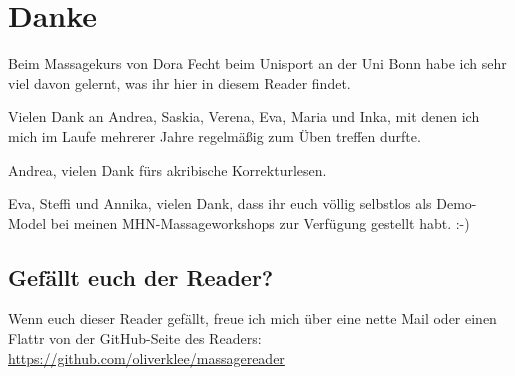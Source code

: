 \section*{Danke}

Beim Massagekurs von Dora Fecht beim Unisport an der Uni Bonn habe ich sehr viel davon gelernt, was ihr hier in diesem Reader findet.

Vielen Dank an Andrea, Saskia, Verena, Eva, Maria und Inka, mit denen ich mich im Laufe mehrerer Jahre regelmäßig zum Üben treffen durfte.

Andrea, vielen Dank fürs akribische Korrekturlesen.

Eva, Steffi und Annika, vielen Dank, dass ihr euch völlig selbstlos als Demo-Model bei meinen MHN-Massageworkshops zur Verfügung gestellt habt. :-)

\subsection*{Gefällt euch der Reader?}

Wenn euch dieser Reader gefällt, freue ich mich über eine nette Mail oder einen Flattr von der GitHub-Seite des Readers: \url{https://github.com/oliverklee/massagereader}
